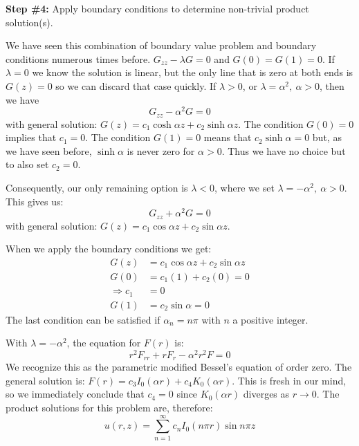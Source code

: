 \vspace{0.25cm}

\noindent\textbf{Step \#4:} Apply boundary conditions to determine non-trivial product solution(s).

\vspace{0.25cm}

\noindent We have seen this combination of boundary value problem and boundary conditions numerous times before.  $G_{zz}-\lambda G = 0$ and $G(0)=G(1)=0$.  If $\lambda=0$ we know the solution is linear, but the only line that is zero at both ends is $G(z)=0$ so we can discard that case quickly.  If $\lambda > 0$, or $\lambda = \alpha^2, \ \alpha>0$, then we have 
\begin{equation*}
G_{zz} - \alpha^2 G = 0
\end{equation*}
with general solution: $G(z) = c_1 \cosh{\alpha z} + c_2 \sinh{\alpha z}$.  The condition $G(0) = 0$ implies that $c_1 = 0$. The condition $G(1) = 0$ means that $c_2 \sinh{\alpha} = 0$ but, as we have seen before, $\sinh{\alpha}$ is never zero for $\alpha > 0$.  Thus we have no choice but to also set $c_2 = 0$.  

Consequently, our only remaining option is $\lambda < 0$, where we set $\lambda = -\alpha^2, \ \alpha > 0$.  This gives us:
\begin{equation*}
G_{zz} + \alpha^2 G = 0
\end{equation*}
with general solution: $G(z) = c_1 \cos{\alpha z} + c_2 \sin{\alpha z}$.

When we apply the boundary conditions we get:
\begin{align*}
G(z) &= c_1 \cos{\alpha z} + c_2 \sin{\alpha z} \\
G(0) &= c_1 (1) + c_2 (0) = 0 \\
\Rightarrow c_1 &= 0 \\ 
G(1) &= c_2 \sin{\alpha} = 0
\end{align*}
The last condition can be satisfied if $\alpha_n = n \pi$ with $n$ a positive integer.  

\vspace{0.25cm}

\noindent With $\lambda = -\alpha^2$, the equation for $F(r)$ is:
\begin{equation*}
r^2F_{rr}+rF_r - \alpha^2r^2F = 0
\end{equation*}
We recognize this as the parametric modified Bessel's equation of order zero.  The general solution is: $F(r) = c_3I_0(\alpha r) + c_4 K_0(\alpha r)$.  This is fresh in our mind, so we immediately conclude that $c_4 = 0$ since $K_0(\alpha r)$ diverges as $r \to 0$.  The product solutions for this problem are, therefore:
\begin{equation}
u(r,z) = \sum\limits_{n=1}^{\infty} c_n I_0(n \pi r) \sin{n \pi z}
\label{eq:lec32-ex2-sol}
\end{equation}

